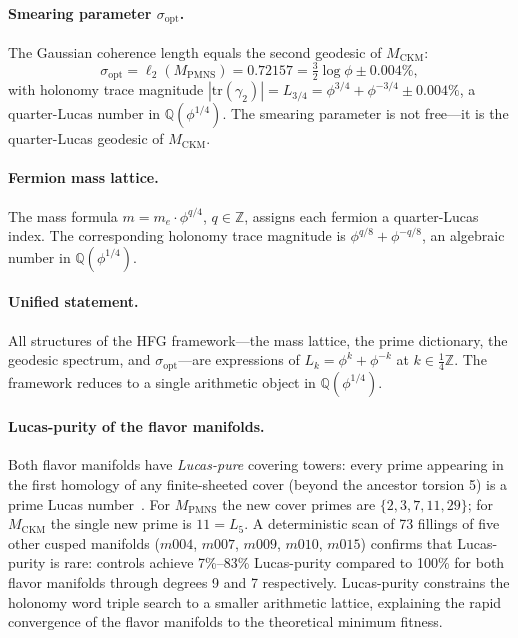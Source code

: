 ﻿\documentclass[12pt]{article}
\theoremstyle{definition}
\begin{document}
\paragraph{Smearing parameter $\sigma_\mathrm{opt}$.}
The Gaussian coherence length equals the second geodesic of $M_\mathrm{CKM}$:
\[
  \sigma_\mathrm{opt} = \ell_2(M_\mathrm{PMNS}) = 0.72157
  = \tfrac{3}{2}\log\phi \pm 0.004\%,
\]
with holonomy trace magnitude $|\mathrm{tr}(\gamma_2)| = L_{3/4} = \phi^{3/4}+\phi^{-3/4} \pm 0.004\%$, a quarter-Lucas number in
$\mathbb{Q}(\phi^{1/4})$. The smearing parameter is not free---it is
the quarter-Lucas geodesic of $M_\mathrm{CKM}$.

\paragraph{Fermion mass lattice.}
The mass formula $m = m_e\cdot\phi^{q/4}$, $q\in\mathbb{Z}$,
assigns each fermion a quarter-Lucas index. The corresponding
holonomy trace magnitude is $\phi^{q/8}+\phi^{-q/8}$, an algebraic
number in $\mathbb{Q}(\phi^{1/4})$.

\paragraph{Unified statement.}
All structures of the HFG framework---the mass lattice, the prime
dictionary, the geodesic spectrum, and $\sigma_\mathrm{opt}$---are
expressions of $L_k = \phi^k+\phi^{-k}$ at $k\in\tfrac{1}{4}\mathbb{Z}$.
The framework reduces to a single arithmetic object in $\mathbb{Q}(\phi^{1/4})$.

\paragraph{Lucas-purity of the flavor manifolds.}
Both flavor manifolds have \emph{Lucas-pure} covering towers: every prime
appearing in the first homology of any finite-sheeted cover (beyond the
ancestor torsion 5) is a prime Lucas number~\cite{Gentry:Lucas}.
For $M_\mathrm{PMNS}$ the new cover primes are $\{2,3,7,11,29\}$;
for $M_\mathrm{CKM}$ the single new prime is $11 = L_5$.
A deterministic scan of 73 fillings of five other cusped manifolds
($m004$, $m007$, $m009$, $m010$, $m015$) confirms that Lucas-purity
is rare: controls achieve 7\%--83\% Lucas-purity compared to 100\%
for both flavor manifolds through degrees 9 and 7 respectively.
Lucas-purity constrains the holonomy word triple search to a smaller
arithmetic lattice, explaining the rapid convergence of the flavor
manifolds to the theoretical minimum fitness.
\end{document}
